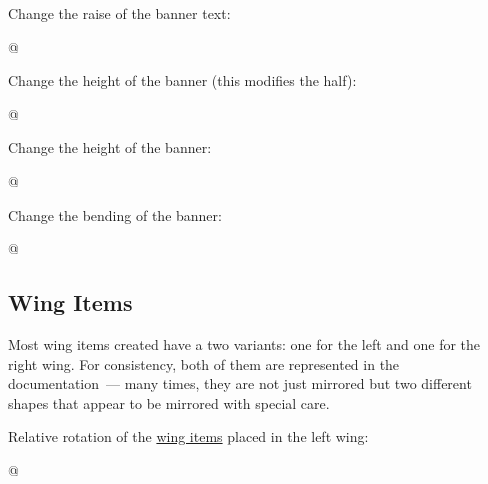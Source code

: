 \documentclass[parskip=half,english,numbers=noenddot,footnotes=nomultiple,oneside]{scrartcl}
\begin{document}
Change the raise of the banner text:
\begin{tcblisting}{@}
\begin{tikzpicture}
	\pingu[banner, banner raise=2mm]
\end{tikzpicture}
\end{tcblisting}
\endsubkeyexplain

Change the height of the banner (this modifies the half):
\begin{tcblisting}{@}
\begin{tikzpicture}
	\pingu[banner, banner height=6mm]
\end{tikzpicture}
\end{tcblisting}
\endsubkeyexplain

Change the height of the banner:
\begin{tcblisting}{@}
\begin{tikzpicture}
	\pingu[banner, banner font=\itshape]
\end{tikzpicture}
\end{tcblisting}
\endsubkeyexplain

Change the bending of the banner:
\begin{tcblisting}{@}
\begin{tikzpicture}
	\pingu[banner, banner bent=0]
\end{tikzpicture}
\end{tcblisting}
\endsubkeyexplain

\subsection{Wing Items}
\label{sub:wing-items}Most wing items created have a two variants: one for the left and one for the right wing. For consistency, both of them are represented in the documentation~--- many times, they are not just mirrored but two different shapes that appear to be mirrored with special care.


	Relative rotation of the \hyperref[sub:wing-items]{wing items} placed in the left wing:
\begin{tcblisting}{@}
\begin{tikzpicture}
	\pingu[cane left, cane right,
	       left wing item angle=70]
\end{tikzpicture}
\end{tcblisting}
\endkeyexplain
\end{document}
